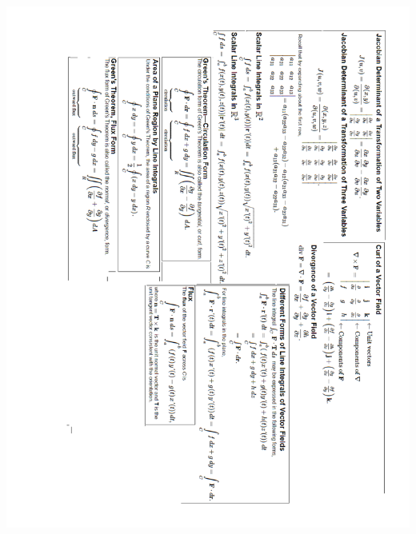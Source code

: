 \documentclass[12pt, addpoints]{exam/exam}
\theoremstyle{plain}
\begin{document}
\begin{coverpages}
\begin{center}
\vspace*{\fill}
\includegraphics[scale=0.84]{Exam3FormulaSheet.pdf}
\vspace*{\fill}
\end{center}
%
%
\end{coverpages}
\end{document}
